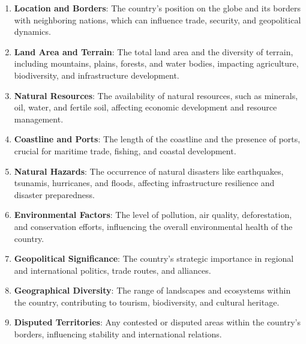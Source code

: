 \begin{enumerate}
  \item \textbf{Location and Borders}: The country's position
  on the globe and its borders with neighboring nations, which
  can influence trade, security, and geopolitical dynamics.
  
  \item \textbf{Land Area and Terrain}: The total land area
  and the diversity of terrain, including mountains, plains,
  forests, and water bodies, impacting agriculture, biodiversity,
  and infrastructure development.
  
  \item \textbf{Natural Resources}: The availability of natural
  resources, such as minerals, oil, water, and fertile soil,
  affecting economic development and resource management.
  
  \item \textbf{Coastline and Ports}: The length of the coastline
  and the presence of ports, crucial for maritime trade, fishing,
  and coastal development.
  
  \item \textbf{Natural Hazards}: The occurrence of natural
  disasters like earthquakes, tsunamis, hurricanes, and floods,
  affecting infrastructure resilience and disaster preparedness.
  
  \item \textbf{Environmental Factors}: The level of pollution, air
  quality, deforestation, and conservation efforts, influencing the
  overall environmental health of the country.
  
  \item \textbf{Geopolitical Significance}: The country's strategic
  importance in regional and international politics, trade routes,
  and alliances.
  
  \item \textbf{Geographical Diversity}: The range of landscapes
  and ecosystems within the country, contributing to tourism,
  biodiversity, and cultural heritage.
  
  \item \textbf{Disputed Territories}: Any contested or disputed
  areas within the country's borders, influencing stability and
  international relations.
\end{enumerate}


